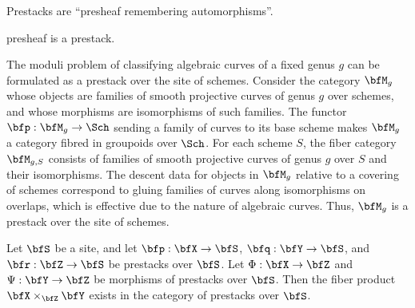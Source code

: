     \begin{slogan}%
        Prestacks are ``presheaf remembering automorphisms''.
    \end{slogan}


    \begin{example}%
        presheaf is a prestack.
    \end{example}

    \begin{example}%
        The moduli problem of classifying algebraic curves of a fixed genus \(g\) can be formulated as a prestack over the site of schemes.
        Consider the category \(\bfM_g\) whose objects are families of smooth projective curves of genus \(g\) over schemes, and whose morphisms are isomorphisms of such families.
        The functor \(\bfp: \bfM_g \to \Sch\) sending a family of curves to its base scheme makes \(\bfM_g\) a category fibred in groupoids over \(\Sch\).
        For each scheme \(S\), the fiber category \(\bfM_{g,S}\) consists of families of smooth projective curves of genus \(g\) over \(S\) and their isomorphisms.
        The descent data for objects in \(\bfM_g\) relative to a covering of schemes correspond to gluing families of curves along isomorphisms on overlaps, which is effective due to the nature of algebraic curves.
        Thus, \(\bfM_g\) is a prestack over the site of schemes.
    \end{example}




    \begin{proposition}%
        Let \(\bfS\) be a site, and let \(\bfp: \bfX \to \bfS\), \(\bfq: \bfY \to \bfS\), and \(\bfr: \bfZ \to \bfS\) be prestacks over \(\bfS\).
        Let \(\Phi: \bfX \to \bfZ\) and \(\Psi: \bfY \to \bfZ\) be morphisms of prestacks over \(\bfS\).
        Then the fiber product \(\bfX \times_{\bfZ} \bfY\) exists in the category of prestacks over \(\bfS\).
    \end{proposition}

